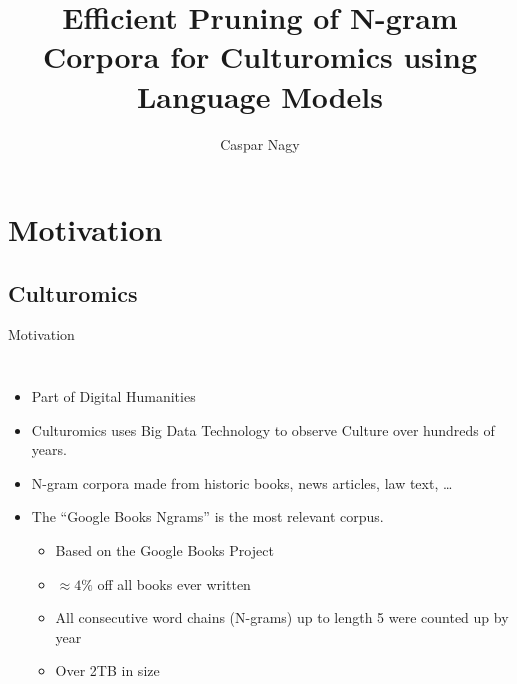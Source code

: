 \documentclass[16:9,en,navbarinfooter]{sdqbeamer}
\title{Efficient Pruning of N-gram Corpora for Culturomics using Language Models}
\subtitle{}
\author{Caspar Nagy}
\begin{document}
\KITtitleframe{}


\section{Motivation}
\subsection{Culturomics}
\begin{frame}[fragile]{Motivation}
\vspace{1cm}
\begin{columns}
\begin{itemize}
    \item Part of Digital Humanities
    \item Culturomics uses Big Data Technology to observe Culture over hundreds of years.
    \item N-gram corpora made from historic books, news articles, 
        law text, \ldots
    \item The ``Google Books Ngrams'' is the most relevant corpus.
        \begin{itemize}
            \item Based on the Google Books Project
            \item $\approx 4\%$ off all books ever written
            \item All consecutive word chains (N-grams) up to length 5 were counted up by year
            \item Over 2TB in size
        \end{itemize}
\end{itemize}


\end{columns}
\end{frame}
\end{document}

